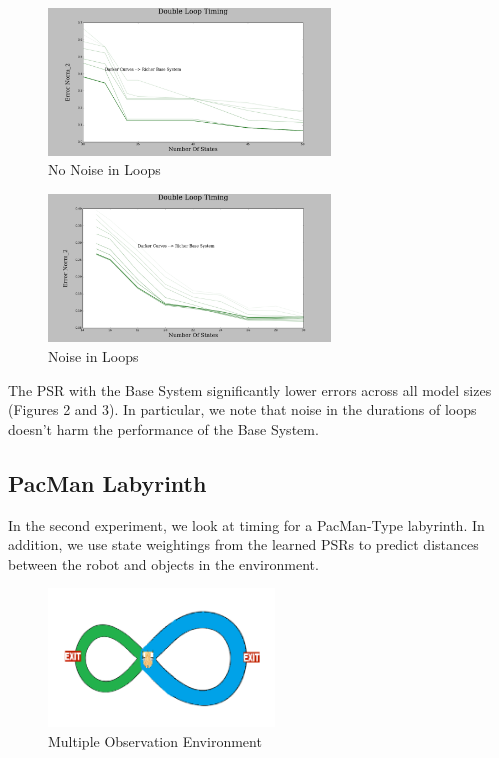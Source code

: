 \documentclass{acm_proc_article-sp}
\begin{document}
\begin{figure}[ht!]
\centering
\includegraphics[width=75mm]{lucasplots/monImages/DoubleLoopTiming0.png}
\caption{No Noise in Loops \label{overflow}}
\end{figure}

\begin{figure}[ht!]
\centering
\includegraphics[width=75mm]{lucasplots/monImages/DoubleLoopTiming0_1.png}
\caption{Noise in Loops \label{overflow}}
\end{figure}

The PSR with the Base System significantly lower errors across all model sizes (Figures 2 and 3). In particular, we note that noise in the durations of loops doesn't harm the performance of the Base System.

\subsection{PacMan Labyrinth}

In the second experiment, we look at timing for a PacMan-Type labyrinth. In addition, we use state weightings from the learned PSRs to predict distances between the robot and objects in the environment. 

\begin{figure}[ht!]
\centering
\includegraphics[width=60mm]{lucasplots/monImages/doubleLoopImageMO.png}
\caption{Multiple Observation Environment \label{overflow}}
\end{figure}
\end{document}
